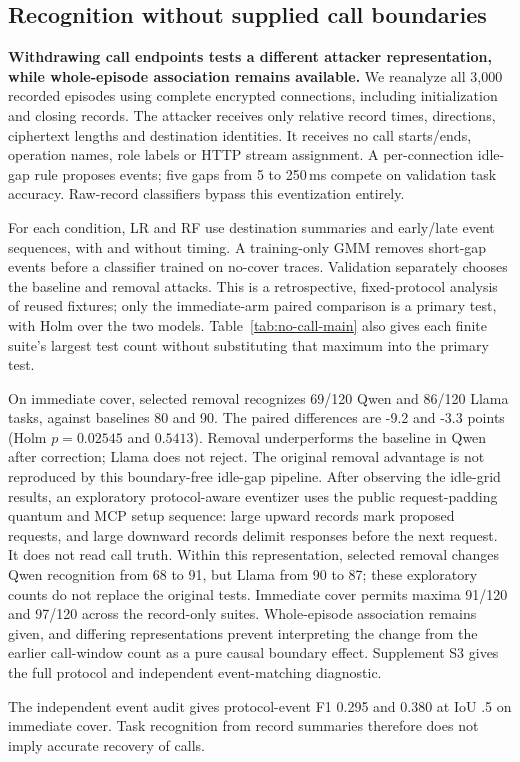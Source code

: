 \subsection{Recognition without supplied call boundaries}\label{sec:no-call}
\textbf{Withdrawing call endpoints tests a different attacker representation, while whole-episode association remains available.}
We reanalyze all 3,000 recorded episodes using complete encrypted connections, including initialization and closing records. The attacker receives only relative record times, directions, ciphertext lengths and destination identities. It receives no call starts/ends, operation names, role labels or HTTP stream assignment. A per-connection idle-gap rule proposes events; five gaps from 5 to 250\,ms compete on validation task accuracy. Raw-record classifiers bypass this eventization entirely.

For each condition, LR and RF use destination summaries and early/late event sequences, with and without timing. A training-only GMM removes short-gap events before a classifier trained on no-cover traces. Validation separately chooses the baseline and removal attacks. This is a retrospective, fixed-protocol analysis of reused fixtures; only the immediate-arm paired comparison is a primary test, with Holm over the two models. Table~\ref{tab:no-call-main} also gives each finite suite's largest test count without substituting that maximum into the primary test.


On immediate cover, selected removal recognizes 69/120 Qwen and 86/120 Llama tasks, against baselines 80 and 90. The paired differences are -9.2 and -3.3 points (Holm $p=0.02545$ and $0.5413$). Removal underperforms the baseline in Qwen after correction; Llama does not reject. The original removal advantage is not reproduced by this boundary-free idle-gap pipeline. After observing the idle-grid results, an exploratory protocol-aware eventizer uses the public request-padding quantum and MCP setup sequence: large upward records mark proposed requests, and large downward records delimit responses before the next request. It does not read call truth. Within this representation, selected removal changes Qwen recognition from 68 to 91, but Llama from 90 to 87; these exploratory counts do not replace the original tests. Immediate cover permits maxima 91/120 and 97/120 across the record-only suites. Whole-episode association remains given, and differing representations prevent interpreting the change from the earlier call-window count as a pure causal boundary effect. Supplement S3 gives the full protocol and independent event-matching diagnostic.

The independent event audit gives protocol-event F1 0.295 and 0.380 at IoU .5 on immediate cover. Task recognition from record summaries therefore does not imply accurate recovery of calls.
